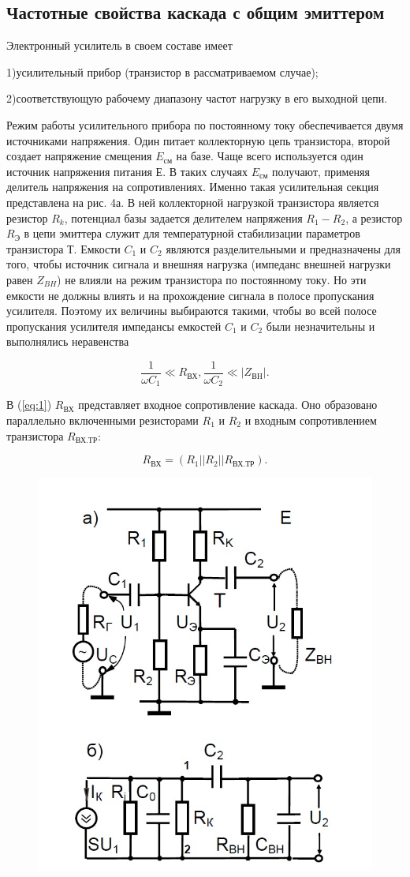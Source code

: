 \subsection{Частотные свойства каскада с общим эмиттером}
Электронный усилитель в своем составе имеет 

1)усилительный прибор (транзистор в рассматриваемом случае);

2)соответствующую рабочему диапазону частот нагрузку в его
выходной цепи.

Режим работы усилительного прибора по постоянному току обеспечивается двумя источниками напряжения. Один питает коллекторную цепь транзистора, второй создает
напряжение смещения $E_{\text{см}}$ на базе. Чаще всего используется один источник напряжения питания Е. В таких случаях $E_{\text{см}}$ получают, применяя делитель напряжения на сопротивлениях. Именно такая усилительная секция представлена на рис. 4а. В ней коллекторной нагрузкой транзистора является резистор $R_k$, потенциал базы
задается делителем напряжения $R_1-R_2$, а резистор $R_{\text{Э}}$ в цепи эмиттера служит для температурной стабилизации параметров транзистора Т. Емкости $C_1$ и $C_2$ являются разделительными и предназначены для того, чтобы источник сигнала и внешняя нагрузка (импеданс внешней нагрузки равен $Z_{BH}$) не влияли на режим транзистора по постоянному току. Но эти емкости не должны влиять и на прохождение сигнала в полосе пропускания усилителя. Поэтому их величины выбираются такими, чтобы во всей полосе пропускания усилителя импедансы емкостей $C_1$ и $C_2$ были незначительны и выполнялись неравенства

\begin{equation}
	\frac{1}{\omega C_1}\ll R_{\text{ВХ}}, \frac{1}{\omega C_2}\ll |Z_{\text{ВH}}|.
	\label{eq:1}
\end{equation}

В (\ref{eq:1}) $R_{\text{ВХ}}$ представляет входное сопротивление каскада. Оно образовано параллельно включенными резисторами $R_1$ и $R_2$ и входным  сопротивлением транзистора $R_{\text{ВХ.ТР}}$:

$$R_{\text{ВХ}}=(R_1||R_2||R_{\text{ВХ.ТР}}).$$

\begin{figure}[h]
	\centering
	\includegraphics[width=0.6\linewidth]{fig/fig4}
	\caption{}
	\label{fig:4}
\end{figure}

